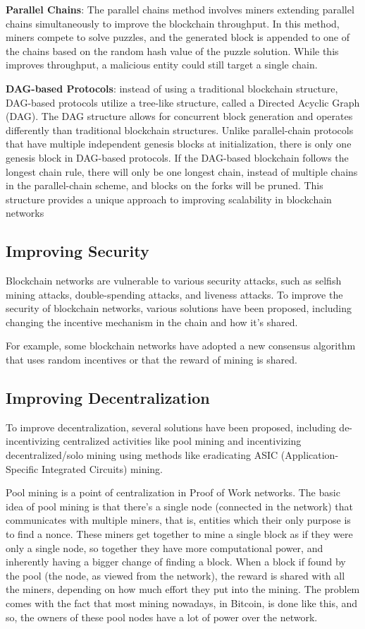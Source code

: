 \textbf{Parallel Chains}: The parallel chains method involves miners extending parallel chains simultaneously to improve the blockchain throughput. In this method, miners compete to solve puzzles, and the generated block is appended to one of the chains based on the random hash value of the puzzle solution. While this improves throughput, a malicious entity could still target a single chain.

\textbf{DAG-based Protocols}: instead of using a traditional blockchain structure, DAG-based protocols utilize a tree-like structure, called a Directed Acyclic Graph (DAG). The DAG structure allows for concurrent block generation and operates differently than traditional blockchain structures. Unlike parallel-chain protocols that have multiple independent genesis blocks at initialization, there is only one genesis block in DAG-based protocols. If the DAG-based blockchain follows the longest chain rule, there will only be one longest chain, instead of multiple chains in the parallel-chain scheme, and blocks on the forks will be pruned. This structure provides a unique approach to improving scalability in blockchain networks 

\subsection*{Improving Security}
Blockchain networks are vulnerable to various security attacks, such as selfish mining attacks, double-spending attacks, and liveness attacks. To improve the security of blockchain networks, various solutions have been proposed, including changing the incentive mechanism in the chain and how it's shared.

For example, some blockchain networks have adopted a new consensus algorithm that uses random incentives or that the reward of mining is shared.

\subsection*{Improving Decentralization}
To improve decentralization, several solutions have been proposed, including de-incentivizing centralized activities like pool mining and incentivizing decentralized/solo mining using methods like eradicating ASIC (Application-Specific Integrated Circuits) mining.

Pool mining is a point of centralization in Proof of Work networks. The basic idea of pool mining is that there's a single node (connected in the network) that communicates with multiple miners, that is, entities which their only purpose is to find a nonce.
These miners get together to mine a single block as if they were only a single node, so together they have more computational power, and inherently having a bigger change of finding a block. When a block if found by the pool (the node, as viewed from the network), the reward is shared with all the miners, depending on how much effort they put into the mining.
The problem comes with the fact that most mining nowadays, in Bitcoin, is done like this, and so, the owners of these pool nodes have a lot of power over the network.

